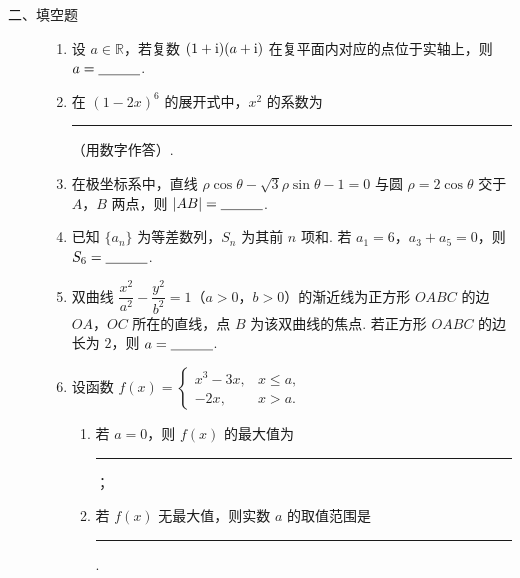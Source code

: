 \begin{description}

    \item[二、填空题]

    \begin{enumerate}[leftmargin=5pt]

      \addtocounter{enumi}{+8}

        \item 设 \(a\in\mathbb{R}\)，若复数 \((1+\mathrm{i})(a+\mathrm{i})\) 在复平面内对应的点位于实轴上，则 \(a=\rule[-0.3ex]{3em}{0.4pt}\).

        \item 在 \((1-2x)^6\) 的展开式中，\(x^2\) 的系数为\rule[-0.3ex]{3em}{0.4pt}（用数字作答）.

        \item 在极坐标系中，直线 \(\rho\cos\theta-\sqrt{3}\rho\sin\theta-1=0\) 与圆 \(\rho=2\cos\theta\) 交于 \(A\)，\(B\) 两点，则 \(|AB|=\rule[-0.3ex]{3em}{0.4pt}\).

        \item 已知 \(\{a_n\}\) 为等差数列，\(S_n\) 为其前 \(n\) 项和. 若 \(a_1=6\)，\(a_3+a_5=0\)，则 \(S_6=\rule[-0.3ex]{3em}{0.4pt}\).

        \item 双曲线 \(\dfrac{x^2}{a^2}-\dfrac{y^2}{b^2}=1\)（\(a>0\)，\(b>0\)）的渐近线为正方形 \(OABC\) 的边 \(OA\)，\(OC\) 所在的直线，点 \(B\) 为该双曲线的焦点. 若正方形 \(OABC\) 的边长为 \(2\)，则 \(a=\rule[-0.3ex]{3em}{0.4pt}\).

        \item 设函数
\(f(x)=\begin{cases}
x^3-3x, & x\le a,\\
-2x, & x>a.
\end{cases}\)

\begin{enumerate}
\item 若 \(a=0\)，则 \(f(x)\) 的最大值为\rule[-0.3ex]{3em}{0.4pt}；
\item 若 \(f(x)\) 无最大值，则实数 \(a\) 的取值范围是\rule[-0.3ex]{3em}{0.4pt}.
\end{enumerate}

    \end{enumerate}

\end{description}

